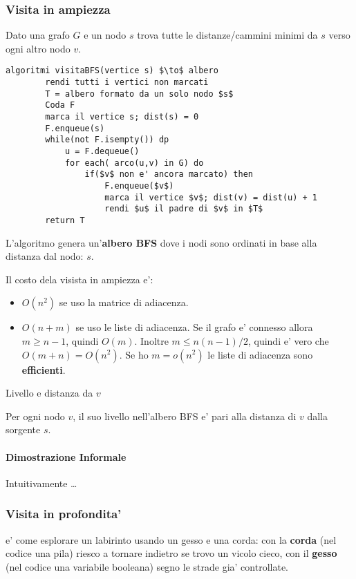 \subsubsection{Visita in ampiezza}
Dato una grafo $G$ e un nodo $s$ trova tutte le distanze/cammini minimi da 
$s$ verso ogni altro nodo $v$.

\begin{lstlisting}[mathescape=true]
    algoritmi visitaBFS(vertice s) $\to$ albero
        rendi tutti i vertici non marcati
        T = albero formato da un solo nodo $s$
        Coda F
        marca il vertice s; dist(s) = 0
        F.enqueue(s)
        while(not F.isempty()) dp
            u = F.dequeue()
            for each( arco(u,v) in G) do
                if($v$ non e' ancora marcato) then
                    F.enqueue($v$)
                    marca il vertice $v$; dist(v) = dist(u) + 1
                    rendi $u$ il padre di $v$ in $T$
        return T
\end{lstlisting}

L'algoritmo genera un'\textbf{albero BFS} dove i nodi sono ordinati 
in base alla distanza dal nodo: $s$.

Il costo dela visista in ampiezza e':
\begin{itemize}
    \item $O(n^2)$ se uso la matrice di adiacenza.
    \item $O(n+m)$ se uso le liste di adiacenza. Se il grafo e' connesso allora $m \geq n-1$, quindi $O(m)$.
    \subitem Inoltre $m \leq n(n-1)/2$, quindi e' vero che $O(m+n) = O(n^2)$.
    \subitem Se ho $m=o(n^2)$ le liste di adiacenza sono \textbf{efficienti}.
\end{itemize}

\begin{definition}{Livello e distanza da $v$}

    Per ogni nodo $v$, il suo livello nell'albero BFS e' pari
    alla distanza di $v$ dalla sorgente $s$.
\end{definition}

\paragraph{Dimostrazione Informale} 
    Intuitivamente \dots

\subsubsection{Visita in profondita'}
e' come esplorare un labirinto usando un gesso e una corda:
con la \textbf{corda} (nel codice una pila) riesco a tornare indietro se trovo un vicolo cieco,
con il \textbf{gesso} (nel codice una variabile booleana) segno le strade gia' controllate.

